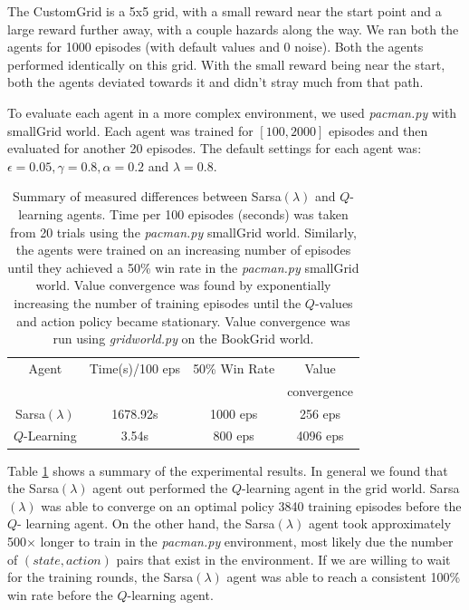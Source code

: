 \documentclass[10pt,conference]{IEEEtran}
\begin{document}
	The CustomGrid is a 5x5 grid, with a small reward near the start point and a large reward further away, with a couple hazards along the way. We ran both the agents for 1000 episodes (with default values and 0 noise). Both the agents performed identically on this grid. With the small reward being near the start, both the agents deviated towards it and didn't stray much from that path. 
	
	To evaluate each agent in a more complex environment, we used 
	\textit{pacman.py} with smallGrid world. Each agent was trained for 
	\([100,2000]\) episodes and then evaluated for another 20 episodes.  The 
	default settings for each agent was: \(\epsilon = 0.05, \gamma = 0.8, 
	\alpha = 0.2\) and \(\lambda = 0.8\).
	
	\begin{table}
		\begin{tabular}{|c|c|c|c|}
			\hline
			Agent & Time(s)/100 eps & 50\% Win Rate & Value \\
			& & & convergence \\
			\hline \hline
			Sarsa\((\lambda)\) & 1678.92s & 1000 eps & 256 eps \\
			\hline
			\(Q\)-Learning & 3.54s & 800 eps & 4096 eps \\
			\hline
		\end{tabular}
		\caption{Summary of measured differences between Sarsa\((\lambda)\)
		and \(Q\)-learning agents.  Time per 100 episodes (seconds) was 
		taken from 20 trials using the \textit{pacman.py} smallGrid world.  
		Similarly, the agents were trained on an increasing number of episodes until 
		they achieved a 50\% win rate in the \textit{pacman.py} smallGrid 
		world.  Value convergence was found by exponentially increasing 
		the number of training episodes until the \(Q\)-values and 
		action policy became stationary.  Value convergence was run
		using \textit{gridworld.py} on the BookGrid world.}
		\label{summary}
	\end{table}
			
	Table \ref{summary} shows a summary of the experimental results.  In 
	general we found that the Sarsa\((\lambda)\) agent out performed the 
	\(Q\)-learning agent in the grid world.  Sarsa\((\lambda)\) was able to 
	converge on an optimal policy 3840 training episodes before the \(Q\)-
	learning agent.  On the other hand, the Sarsa\((\lambda)\) agent took approximately
	500\(\times\) longer to train in the \textit{pacman.py} environment, most 
	likely due the number of \((state, action)\) pairs that exist in the 
	environment.  If we are willing to wait for the training rounds, the 
	Sarsa\((\lambda)\) agent was able to reach a consistent 100\% win rate before
	the \(Q\)-learning agent. 
\end{document}
